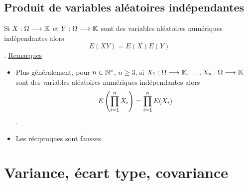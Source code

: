 \subsection{Produit de variables aléatoires indépendantes}
\begin{defprop}
    Si \(X : \Omega \longrightarrow \mathbb{K}\) et \(Y : \Omega \longrightarrow \mathbb{K}\) sont des variables aléatoires numériques indépendantes alors 
        \[E(XY ) = E(X)E(Y )\].
    \underline{Remarques}\\
    \begin{itemize}
        \item Plus généralement, pour \(n \in  \mathbb{N}^*\), \(n \geq 3\), si \(X_1 : \Omega \longrightarrow \mathbb{K}, \dots , X_n : \Omega \longrightarrow \mathbb{K}\) sont des variables aléatoires numériques indépendantes alors
        \[E\left(\prod^n_{i=1}X_i\right)= \prod^n_{i=1} E(X_i)\].
        \item Les réciproques sont fausses.
    \end{itemize}
\end{defprop}
\section{Variance, écart type, covariance}
